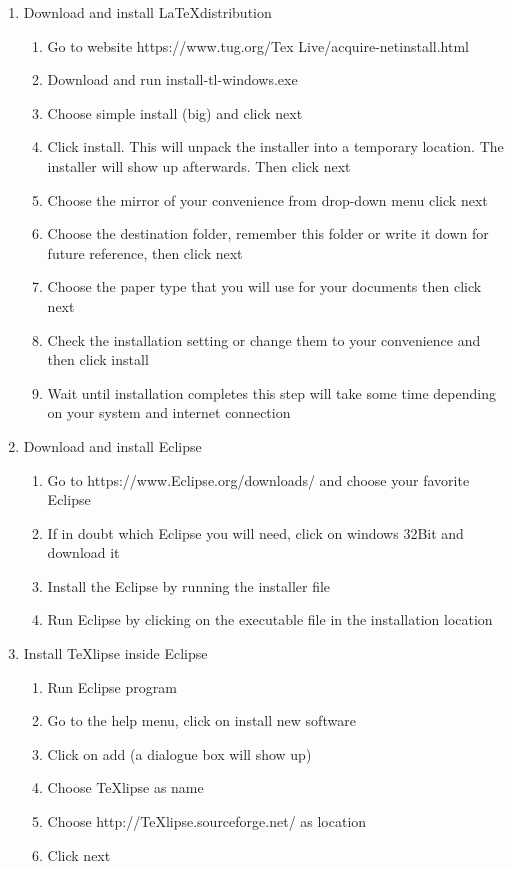 \documentclass{memoir}
\begin{document}
\begin{enumerate}
  \item Download and install \LaTeX  distribution
\begin{enumerate}
  \item Go to website https://www.tug.org/Tex Live/acquire-netinstall.html 
  \item Download and run install-tl-windows.exe
  \item Choose simple install (big) and click next
  \item Click install. This will unpack the installer into a temporary location. The installer will show up afterwards. Then click next
  \item Choose the mirror of your convenience from drop-down menu click next
  \item Choose the destination folder, remember this folder or write it down for future reference, then click next
  \item Choose the paper type that you will use for your documents then click next
  \item Check the installation setting or change them to your convenience and then click install
  \item Wait until installation completes this step will take some time depending on your system and internet connection
\end{enumerate}
\item Download and install Eclipse 
\begin{enumerate}
  \item Go to https://www.Eclipse.org/downloads/ and choose your favorite Eclipse
  \item If in doubt which Eclipse you will need, click on windows 32Bit and download it
  \item Install the Eclipse by running the installer file
  \item Run Eclipse by clicking on the executable file in the installation location
\end{enumerate}
  \item Install TeXlipse inside Eclipse
  \begin{enumerate}
    \item Run Eclipse program 
    \item Go to the help menu, click on install new software
    \item Click on add (a dialogue box will show up)
    \item Choose TeXlipse as name
    \item Choose http://TeXlipse.sourceforge.net/ as location
    \item Click next
  \end{enumerate}
  

\end{enumerate}
\end{document}
